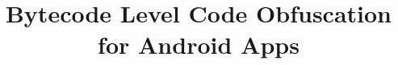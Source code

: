 \documentclass{sig-alternate-05-2015}
\newcommand\FIXME[1]{\textcolor{red}{FIX:}\textcolor{red}{#1}}
\newcommand{\ToolName}{\textsc{DexPro}\xspace}
\begin{document}
\title{Bytecode Level Code Obfuscation for Android Apps}
\author{}

\maketitle

\begin{abstract}



\end{abstract}
\end{document}
